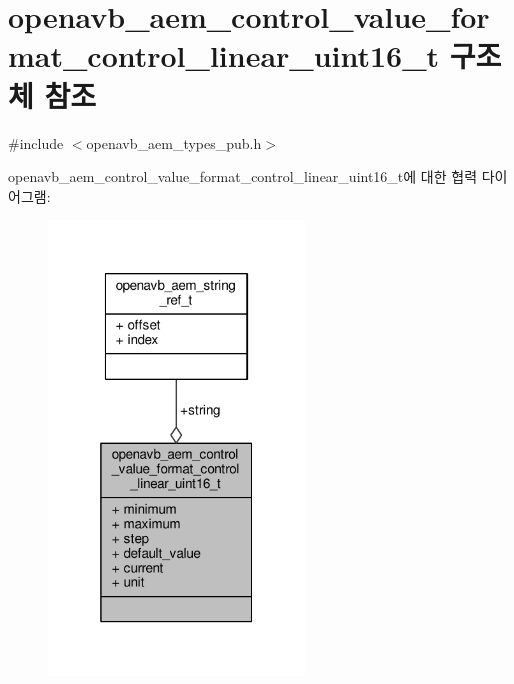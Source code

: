 \hypertarget{structopenavb__aem__control__value__format__control__linear__uint16__t}{}\section{openavb\+\_\+aem\+\_\+control\+\_\+value\+\_\+format\+\_\+control\+\_\+linear\+\_\+uint16\+\_\+t 구조체 참조}
\label{structopenavb__aem__control__value__format__control__linear__uint16__t}


{\ttfamily \#include $<$openavb\+\_\+aem\+\_\+types\+\_\+pub.\+h$>$}



openavb\+\_\+aem\+\_\+control\+\_\+value\+\_\+format\+\_\+control\+\_\+linear\+\_\+uint16\+\_\+t에 대한 협력 다이어그램\+:
\nopagebreak
\begin{figure}[H]
\begin{center}
\leavevmode
\includegraphics[width=193pt]{structopenavb__aem__control__value__format__control__linear__uint16__t__coll__graph}
\end{center}
\end{figure}
